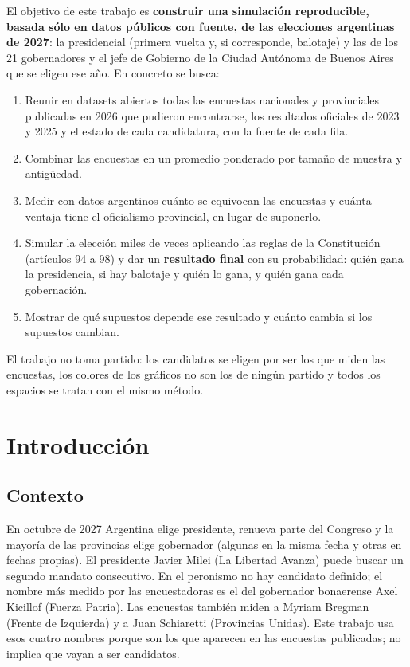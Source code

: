 \documentclass{article}
\begin{document}
El objetivo de este trabajo es \textbf{construir una simulación reproducible,
basada sólo en datos públicos con fuente, de las elecciones argentinas de 2027}:
la presidencial (primera vuelta y, si corresponde, balotaje) y las de los 21
gobernadores y el jefe de Gobierno de la Ciudad Autónoma de Buenos Aires que se
eligen ese año. En concreto se busca:

\begin{enumerate}
  \item Reunir en datasets abiertos todas las encuestas nacionales y provinciales
        publicadas en 2026 que pudieron encontrarse, los resultados oficiales
        de 2023 y 2025 y el estado de cada candidatura, con la fuente de cada fila.
  \item Combinar las encuestas en un promedio ponderado por tamaño de muestra y
        antigüedad.
  \item Medir con datos argentinos cuánto se equivocan las encuestas y cuánta
        ventaja tiene el oficialismo provincial, en lugar de suponerlo.
  \item Simular la elección miles de veces aplicando las reglas de la
        Constitución (artículos 94 a 98) y dar un \textbf{resultado final} con
        su probabilidad: quién gana la presidencia, si hay balotaje y quién lo
        gana, y quién gana cada gobernación.
  \item Mostrar de qué supuestos depende ese resultado y cuánto cambia si los
        supuestos cambian.
\end{enumerate}

El trabajo no toma partido: los candidatos se eligen por ser los que miden las
encuestas, los colores de los gráficos no son los de ningún partido y todos los
espacios se tratan con el mismo método.

\section{Introducción}

\subsection{Contexto}

En octubre de 2027 Argentina elige presidente, renueva parte del Congreso y la
mayoría de las provincias elige gobernador (algunas en la misma fecha y otras en
fechas propias). El presidente Javier Milei (La Libertad Avanza) puede buscar un
segundo mandato consecutivo. En el peronismo no hay candidato definido; el
nombre más medido por las encuestadoras es el del gobernador bonaerense Axel
Kicillof (Fuerza Patria). Las encuestas también miden a Myriam Bregman (Frente
de Izquierda) y a Juan Schiaretti (Provincias Unidas). Este trabajo usa esos
cuatro nombres porque son los que aparecen en las encuestas publicadas; no
implica que vayan a ser candidatos.
\end{document}
